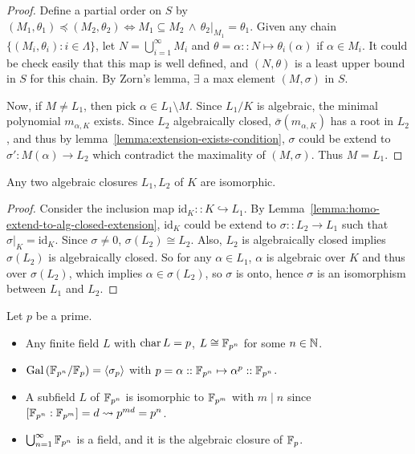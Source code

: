 \begin{theorem}
\begin{lemma}
\begin{proof}
      Define a partial order on $S$ by $(M_1, \theta_1) \preceq (M_2, \theta_2)
      \iff M_1 \subseteq M_2 \,\land\, \theta_2 \big|_{M_1} = \theta_1$.
      Given any chain $\{(M_i, \theta_i) : i \in \Lambda \}$, let $N = \bigcup_{i = 1}^\infty M_i$ and
      $\theta = \alpha :: N \mapsto \theta_i(\alpha)$ if $\alpha \in M_i$. It could
      be check easily that this map is well defined, and $(N, \theta)$ is
      a least upper bound in $S$ for this chain.  By Zorn's lemma, $\exists$ a max element $(M, \sigma)$ in $S$.

      Now, if $M \neq L_1$, then pick $\alpha \in L_1 \setminus M$. Since $L_1/K$ is algebraic,
      the minimal polynomial $m_{\alpha, K}$ exists. Since $L_2$ algebraically closed, $\bar\sigma(m_{\alpha, K})$
      has a root in $L_2$, and thus by lemma~\ref{lemma:extension-exists-condition},
      $\sigma$ could be extend to $\sigma': M(\alpha) \to L_2$ which contradict the maximality of $(M, \sigma)$.
      Thus $M = L_1$.
    \end{proof}
  \end{lemma}

  \begin{theorem}
    Any two algebraic closures $L_1, L_2$ of $K$ are isomorphic.
    \begin{proof}
      Consider the inclusion map $\text{id}_K :: K \hookrightarrow L_1$.
      By Lemma~\ref{lemma:homo-extend-to-alg-closed-extension},
      $\text{id}_K$ could be extend to $\sigma :: L_2 \to L_1$ such that $\sigma\big|_K = \text{id}_K$.
      Since $\sigma \neq 0$, $\sigma(L_2) \cong L_2$.
      Also, $L_2$ is algebraically closed implies $\sigma(L_2)$ is algebraically closed.
      So for any $\alpha \in L_1$, $\alpha$ is algebraic over $K$ and thus over $\sigma(L_2)$,
      which implies $\alpha \in \sigma(L_2)$, so $\sigma$ is onto, hence $\sigma$ is an
      isomorphism between $L_1$ and $L_2$.
    \end{proof}
  \end{theorem}

  \begin{example}
    Let $p$ be a prime.
    \begin{itemize}
      \item Any finite field $L$ with $\operatorname{char} L = p$, $L \cong \mathbb{F}_{p^n}$ for
        some $n \in \mathbb{N}$.
      \item $\operatorname{Gal}\left(\mathbb{F}_{p^n} / \mathbb{F}_p\right) = \langle\sigma_p\rangle$ with
        $p = \alpha :: \mathbb{F}_{p^n} \mapsto \alpha^p :: \mathbb{F}_{p^n}$.
      \item A subfield $L$ of $\mathbb{F}_{p^n}$ is isomorphic to $\mathbb{F}_{p^m}$ with
        $m \mid n$ since $[\mathbb{F}_{p^n} : \mathbb{F}_{p^m}] = d \leadsto p^{md} = p^n$.
      \item $\bigcup_{n=1}^\infty \mathbb{F}_{p^n}$ is a field, and it is the
        algebraic closure of $\mathbb{F}_p$.
    \end{itemize}
  \end{example}
\end{theorem}

